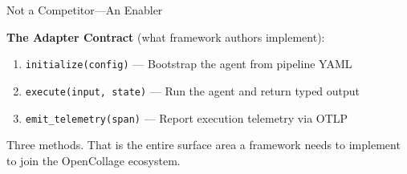 \begin{frame}{Not a Competitor---An Enabler}
  \vspace{0.1cm}

  \fontsize{6}{7}\selectfont
  \textbf{The Adapter Contract} (what framework authors implement):
  \begin{enumerate}
    \item \texttt{initialize(config)} --- Bootstrap the agent from pipeline YAML
    \item \texttt{execute(input, state)} --- Run the agent and return typed output
    \item \texttt{emit\_telemetry(span)} --- Report execution telemetry via OTLP
  \end{enumerate}
  \vspace{-0.2cm}
  \begin{exampleblock}{}
    \fontsize{6}{7}\selectfont
    Three methods. That is the entire surface area a framework needs to implement
    to join the OpenCollage ecosystem.
  \end{exampleblock}
\end{frame}
